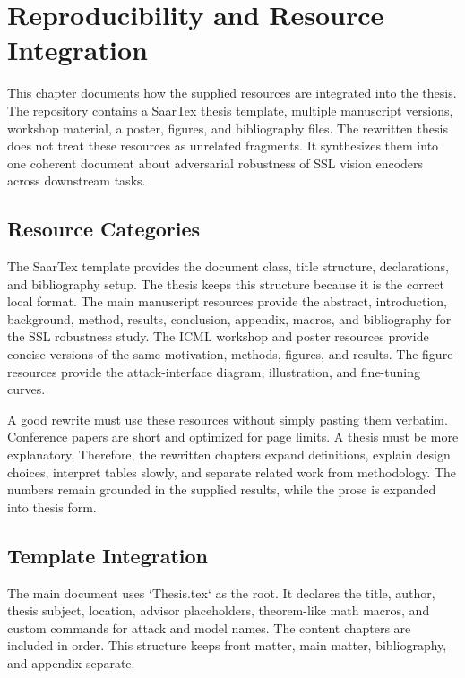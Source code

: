 \chapter{Reproducibility and Resource Integration}
\label{chap:reproducibility}

This chapter documents how the supplied resources are integrated into the thesis. The repository contains a SaarTex thesis template, multiple manuscript versions, workshop material, a poster, figures, and bibliography files. The rewritten thesis does not treat these resources as unrelated fragments. It synthesizes them into one coherent document about adversarial robustness of SSL vision encoders across downstream tasks.

\section{Resource Categories}

The SaarTex template provides the document class, title structure, declarations, and bibliography setup. The thesis keeps this structure because it is the correct local format. The main manuscript resources provide the abstract, introduction, background, method, results, conclusion, appendix, macros, and bibliography for the SSL robustness study. The ICML workshop and poster resources provide concise versions of the same motivation, methods, figures, and results. The figure resources provide the attack-interface diagram, \DeACL illustration, and fine-tuning curves.

A good rewrite must use these resources without simply pasting them verbatim. Conference papers are short and optimized for page limits. A thesis must be more explanatory. Therefore, the rewritten chapters expand definitions, explain design choices, interpret tables slowly, and separate related work from methodology. The numbers remain grounded in the supplied results, while the prose is expanded into thesis form.

\section{Template Integration}

The main document uses `Thesis.tex` as the root. It declares the title, author, thesis subject, location, advisor placeholders, theorem-like math macros, and custom commands for attack and model names. The content chapters are included in order. This structure keeps front matter, main matter, bibliography, and appendix separate.

